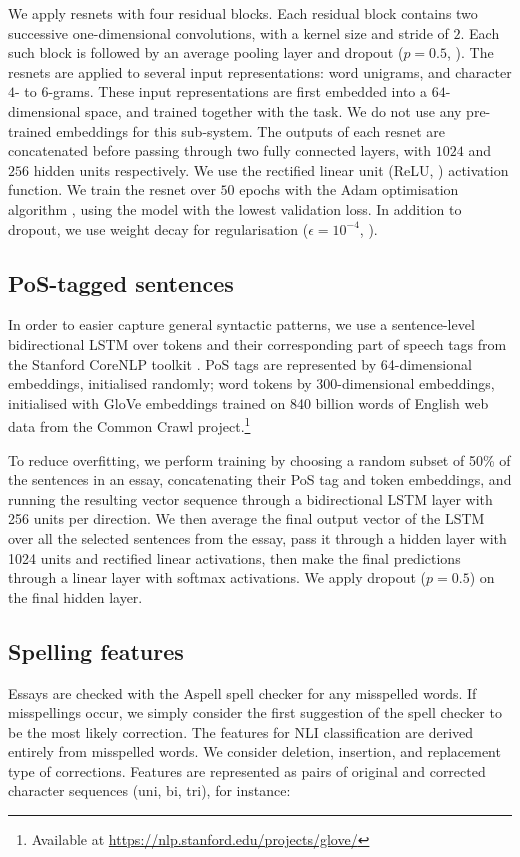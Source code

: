 \documentclass[11pt,letterpaper]{article}
\begin{document}
We apply resnets with four residual blocks.
Each residual block contains two successive one-dimensional convolutions, with a kernel size and stride of $2$.
Each such block is followed by an average pooling layer and dropout ($p=0.5$, \citet{dropout}).
The resnets are applied to several input representations: word unigrams, and character $4$- to $6$-grams.
These input representations are first embedded into a $64$-dimensional space, and trained together with the task.
We do not use any pre-trained embeddings for this sub-system.
The outputs of each resnet are concatenated before passing through two fully connected layers, with $1024$ and $256$ hidden units respectively.
We use the rectified linear unit (ReLU, \citet{rectifier}) activation function.
We train the resnet over $50$ epochs with the Adam optimisation algorithm \citep{adam}, using the model with the lowest validation loss.
In addition to dropout, we use weight decay for regularisation ($\epsilon=10^{-4}$, \citet{weightdecay}).

\subsection{PoS-tagged sentences}
In order to easier capture general syntactic patterns, we use a sentence-level
bidirectional LSTM over tokens and their corresponding part of speech tags
from the Stanford CoreNLP toolkit \citep{Manning2014corenlp}.  PoS tags are
represented by
64-dimensional embeddings, initialised randomly;  word tokens by
300-dimensional embeddings, initialised with GloVe \citep{Pennington2014glove}
embeddings trained on 840 billion words of English web data from the Common
Crawl project.\footnote{ Available at
\url{https://nlp.stanford.edu/projects/glove/}}

To reduce overfitting, we perform training by choosing a random subset of 50\%
of the sentences in an essay, concatenating their PoS tag and token
embeddings, and running the resulting vector sequence through a bidirectional
LSTM layer with 256 units per direction. We then average the final output
vector of the LSTM over all the selected sentences from the essay, pass it
through a hidden layer with 1024 units and rectified linear activations, then
make the final predictions through a linear layer with softmax activations.
We apply dropout ($p = 0.5$) on the final hidden layer.

\subsection{Spelling features}
Essays are checked with the Aspell spell checker for any misspelled words. If misspellings occur, we simply consider the first suggestion of the spell checker to be the most likely correction. 
The features for NLI classification are derived entirely from misspelled words. We consider deletion, insertion, and replacement type of corrections. Features are represented as pairs of original and corrected character sequences (uni, bi, tri), for instance:
\end{document}
